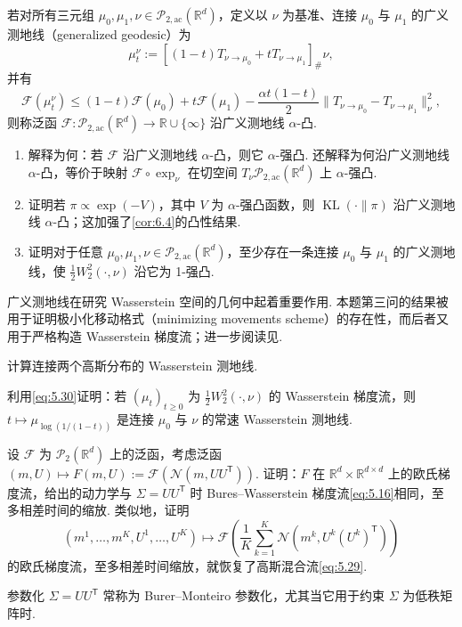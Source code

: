 \begin{exercise}\label{exer:5.9}
若对所有三元组 $\mu_0,\mu_1,\nu\in\mathcal P_{2,\mathrm{ac}}(\mathbb R^d)$，定义以 $\nu$ 为基准、连接 $\mu_0$ 与 $\mu_1$ 的广义测地线（generalized geodesic）为
$$
\mu_t^\nu:=[(1-t)T_{\nu\to\mu_0}+tT_{\nu\to\mu_1}]_\#\nu,
$$
并有
$$
\mathcal F(\mu_t^\nu)
\leq(1-t)\mathcal F(\mu_0)+t\mathcal F(\mu_1)
-\frac{\alpha t(1-t)}2\|T_{\nu\to\mu_0}-T_{\nu\to\mu_1}\|_\nu^2,
$$
则称泛函 $\mathcal F:\mathcal P_{2,\mathrm{ac}}(\mathbb R^d)\to\mathbb R\cup\{\infty\}$ 沿广义测地线 $\alpha$-凸.
\begin{enumerate}
\renewcommand{\labelenumi}{(\alph{enumi})}
\item 解释为何：若 $\mathcal F$ 沿广义测地线 $\alpha$-凸，则它 $\alpha$-强凸. 还解释为何沿广义测地线 $\alpha$-凸，等价于映射 $\mathcal F\circ\exp_\nu$ 在切空间 $T_\nu\mathcal P_{2,\mathrm{ac}}(\mathbb R^d)$ 上 $\alpha$-强凸.
\item 证明若 $\pi\propto\exp(-V)$，其中 $V$ 为 $\alpha$-强凸函数，则 $\operatorname{KL}(\cdot\|\pi)$ 沿广义测地线 $\alpha$-凸；这加强了\autoref{cor:6.4}的凸性结果.
\item 证明对于任意 $\mu_0,\mu_1,\nu\in\mathcal P_{2,\mathrm{ac}}(\mathbb R^d)$，至少存在一条连接 $\mu_0$ 与 $\mu_1$ 的广义测地线，使 $\frac12W_2^2(\cdot,\nu)$ 沿它为 1-强凸.
\end{enumerate}
\begin{remark*}
广义测地线在研究 Wasserstein 空间的几何中起着重要作用. 本题第三问的结果被用于证明极小化移动格式（minimizing movements scheme）的存在性，而后者又用于严格构造 Wasserstein 梯度流；进一步阅读见\cite{ref18}.
\end{remark*}
\end{exercise}

\begin{exercise}\label{exer:5.10}
计算连接两个高斯分布的 Wasserstein 测地线.
\end{exercise}

\begin{exercise}\label{exer:5.11}
利用\eqref{eq:5.30}证明：若 $(\mu_t)_{t\geq0}$ 为 $\frac12W_2^2(\cdot,\nu)$ 的 Wasserstein 梯度流，则 $t\mapsto\mu_{\log(1/(1-t))}$ 是连接 $\mu_0$ 与 $\nu$ 的常速 Wasserstein 测地线.
\end{exercise}

\begin{exercise}\label{exer:5.12}
设 $\mathcal F$ 为 $\mathcal P_2(\mathbb R^d)$ 上的泛函，考虑泛函 $(m,U)\mapsto F(m,U):=\mathcal F(\mathcal N(m,UU^{\mathsf T}))$. 证明：$F$ 在 $\mathbb R^d\times\mathbb R^{d\times d}$ 上的欧氏梯度流，给出的动力学与 $\Sigma=UU^{\mathsf T}$ 时 Bures--Wasserstein 梯度流\eqref{eq:5.16}相同，至多相差时间的缩放. 类似地，证明
$$
(m^1,\ldots,m^K,U^1,\ldots,U^K)
\mapsto\mathcal F\left(\frac1K\sum_{k=1}^K\mathcal N(m^k,U^k(U^k)^{\mathsf T})\right)
$$
的欧氏梯度流，至多相差时间缩放，就恢复了高斯混合流\eqref{eq:5.29}.
\begin{remark*}
参数化 $\Sigma=UU^{\mathsf T}$ 常称为 Burer--Monteiro 参数化，尤其当它用于约束 $\Sigma$ 为低秩矩阵时\cite{ref60,ref61}.
\end{remark*}
\end{exercise}

